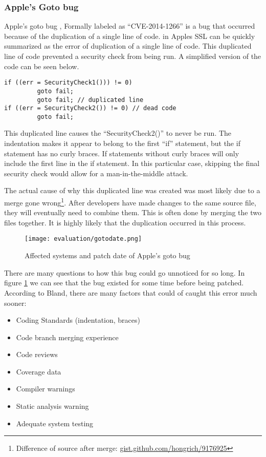 \subsubsection{Apple's Goto bug}
Apple's goto bug , Formally labeled as ``CVE-2014-1266'' \cite{bland2014finding} is a bug that occurred because of the duplication of a single line of code.  in Apples SSL can be quickly summarized as the error of duplication of a single line of code. This duplicated line of code prevented a security check from being run. A simplified version of the code can be seen below.

\begin{lstlisting}[style=myScalastyle]
if ((err = SecurityCheck1())) != 0)
         goto fail;
         goto fail; // duplicated line
if ((err = SecurityCheck2()) != 0) // dead code
         goto fail;
\end{lstlisting}

This duplicated line causes the ``SecurityCheck2()'' to never be run. The indentation makes it appear to belong to the first ``if'' statement, but the if statement has no curly braces. If statements without curly braces will only include the first line in the if statement.  In this particular case, skipping the final security check would allow for a man-in-the-middle attack.

The actual cause of why this duplicated line was created was most likely due to a merge gone wrong\footnote{Difference of source after merge: \href{https://gist.github.com/hongrich/9176925}{gist.github.com/hongrich/9176925}}. After developers have made changes to the same source file, they will eventually need to combine them. This is often done by merging the two files together. It is highly likely that the duplication occurred in this process.
\begin{figure}[H]
  \centering
  \texttt{[image: evaluation/gotodate.png]}
  \caption{Affected systems and patch date of Apple's goto bug \cite{bland2014finding}}
  \label{fig:gotofail}
\end{figure}

There are many questions to how this bug could go unnoticed for so long. In figure \ref{fig:gotofail} we can see that the bug existed for some time before being patched. According to Bland, there are many factors that could of caught this error much sooner:
\begin{itemize}
  \item Coding Standards (indentation, braces)
  \item Code branch merging experience
  \item Code reviews
  \item Coverage data
  \item Compiler warnings
  \item Static analysis warning
  \item Adequate system testing
\end{itemize}

